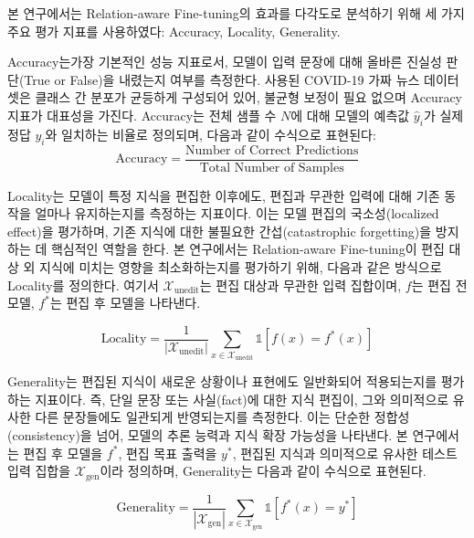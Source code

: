 \documentclass[a4paper,fleqn]{cas-sc}
\begin{document}
본 연구에서는 Relation-aware Fine-tuning의 효과를 다각도로 분석하기 위해 세 가지 주요 평가 지표를 사용하였다: Accuracy, Locality, Generality.


Accuracy는가장 기본적인 성능 지표로서, 모델이 입력 문장에 대해 올바른 진실성 판단(True or False)을 내렸는지 여부를 측정한다.  
사용된 COVID-19 가짜 뉴스 데이터셋은 클래스 간 분포가 균등하게 구성되어 있어, 불균형 보정이 필요 없으며 Accuracy 지표가 대표성을 가진다.  
Accuracy는 전체 샘플 수 \( N \)에 대해 모델의 예측값 \( \hat{y}_i \)가 실제 정답 \( y_i \)와 일치하는 비율로 정의되며, 다음과 같이 수식으로 표현된다:
\begin{equation}
    \text{Accuracy} = \frac{\text{Number of Correct Predictions}}{\text{Total Number of Samples}}
\end{equation}

Locality는 모델이 특정 지식을 편집한 이후에도, 편집과 무관한 입력에 대해 기존 동작을 얼마나 유지하는지를 측정하는 지표이다.
이는 모델 편집의 국소성(localized effect)을 평가하며, 기존 지식에 대한 불필요한 간섭(catastrophic forgetting)을 방지하는 데 핵심적인 역할을 한다.
본 연구에서는 Relation-aware Fine-tuning이 편집 대상 외 지식에 미치는 영향을 최소화하는지를 평가하기 위해, 다음과 같은 방식으로 Locality를 정의한다.
여기서 \( \mathcal{X}_{\text{unedit}} \)는 편집 대상과 무관한 입력 집합이며, \( f \)는 편집 전 모델, \( f^* \)는 편집 후 모델을 나타낸다.

\begin{equation}
\text{Locality} = \frac{1}{\left| \mathcal{X}_{\text{unedit}} \right|} \sum_{x \in \mathcal{X}_{\text{unedit}}} \mathbb{1} \left[ f(x) = f^*(x) \right]
\end{equation}



 
Generality는 편집된 지식이 새로운 상황이나 표현에도 일반화되어 적용되는지를 평가하는 지표이다.  
즉, 단일 문장 또는 사실(fact)에 대한 지식 편집이, 그와 의미적으로 유사한 다른 문장들에도 일관되게 반영되는지를 측정한다.  
이는 단순한 정합성(consistency)을 넘어, 모델의 추론 능력과 지식 확장 가능성을 나타낸다.
본 연구에서는 편집 후 모델을 \( f^* \), 편집 목표 출력을 \( y^* \), 편집된 지식과 의미적으로 유사한 테스트 입력 집합을 \( \mathcal{X}_{\text{gen}} \)이라 정의하며, Generality는 다음과 같이 수식으로 표현된다.

\begin{equation}
\text{Generality} = \frac{1}{\left| \mathcal{X}_{\text{gen}} \right|} \sum_{x \in \mathcal{X}_{\text{gen}}} \mathbb{1} \left[ f^*(x) = y^* \right]
\end{equation}
\end{document}
